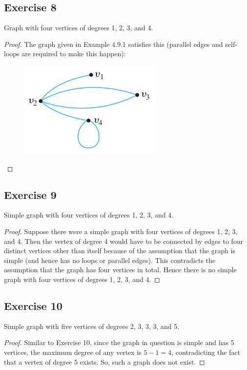 \documentclass[14pt]{extarticle}
\begin{document}
\subsection{Exercise 8}
Graph with four vertices of degrees 1, 2, 3, and 4.

\begin{proof}
The graph given in Example 4.9.1 satisfies this (parallel edges and self-loops are required to make this happen):
\begin{figure}[ht!]
\centering
\includegraphics[scale=0.5]{../images/4.9.8.png}
\end{figure}
\end{proof}

\subsection{Exercise 9}
Simple graph with four vertices of degrees 1, 2, 3, and 4.

\begin{proof}
Suppose there were a simple graph with four vertices of degrees 1, 2, 3, and 4. Then the vertex of degree 4 would have to be connected by edges to four distinct vertices other than itself because of the assumption that the graph is simple (and hence has no loops or parallel edges). This contradicts the assumption that the graph has four vertices in total. Hence there is no simple graph with four vertices of degrees 1, 2, 3, and 4.
\end{proof}

\subsection{Exercise 10}
Simple graph with five vertices of degrees 2, 3, 3, 3, and 5.

\begin{proof}
Similar to Exercise 10, since the graph in question is simple and has 5 vertices, the maximum degree of any vertex is $5 - 1 = 4$, contradicting the fact that a vertex of degree 5 exists. So, such a graph does not exist.
\end{proof}
\end{document}

